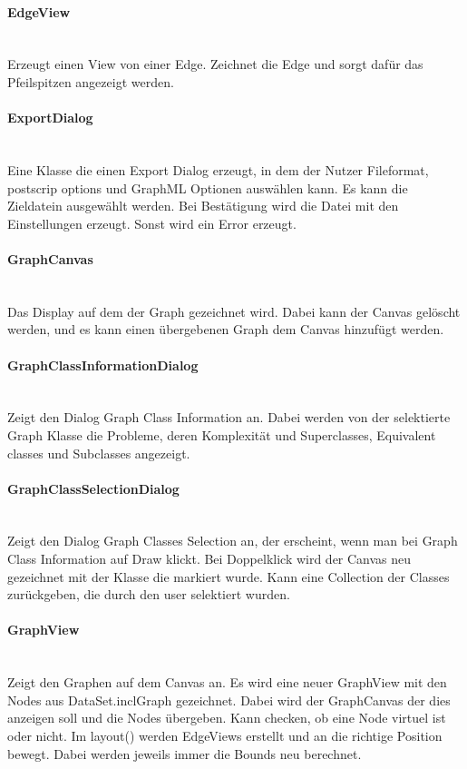 \documentclass[10pt,a4paper]{article}
\begin{document}
\paragraph{EdgeView}\ \\Erzeugt einen View von einer Edge. Zeichnet die Edge und sorgt dafür das Pfeilspitzen angezeigt werden.

\paragraph{ExportDialog}\ \\Eine Klasse die einen Export Dialog erzeugt, in dem der Nutzer Fileformat, postscrip options und GraphML Optionen auswählen kann. Es kann die Zieldatein ausgewählt werden. Bei Bestätigung wird die Datei mit den Einstellungen erzeugt. Sonst wird ein Error erzeugt.

\paragraph{GraphCanvas}\ \\Das Display auf dem der Graph gezeichnet wird. Dabei kann der Canvas gelöscht werden, und es kann einen übergebenen Graph dem Canvas hinzufügt werden.

\paragraph{GraphClassInformationDialog}\ \\Zeigt den Dialog Graph Class Information an. Dabei werden von der selektierte Graph Klasse die Probleme, deren Komplexität und Superclasses, Equivalent classes und Subclasses angezeigt.

\paragraph{GraphClassSelectionDialog}\ \\Zeigt den Dialog Graph Classes Selection an, der erscheint, wenn man bei Graph Class Information auf Draw klickt. Bei Doppelklick wird der Canvas neu gezeichnet mit der Klasse die markiert wurde. Kann eine Collection der Classes zurückgeben, die durch den user selektiert wurden. 

\paragraph{GraphView}\ \\Zeigt den Graphen auf dem Canvas an. Es wird eine neuer GraphView mit den Nodes aus DataSet.inclGraph gezeichnet. Dabei wird der GraphCanvas der dies anzeigen soll und die Nodes übergeben. Kann checken, ob eine Node virtuel ist oder nicht. Im layout() werden EdgeViews erstellt und an die richtige Position bewegt. Dabei werden jeweils immer die Bounds neu berechnet.
\end{document}
